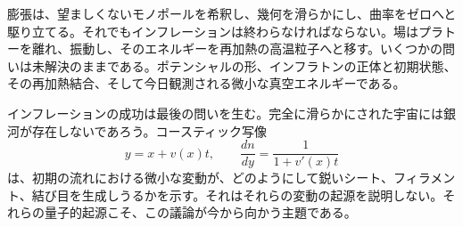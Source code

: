 膨張は、望ましくないモノポールを希釈し、幾何を滑らかにし、曲率をゼロへと駆り立てる。それでもインフレーションは終わらなければならない。場はプラトーを離れ、振動し、そのエネルギーを再加熱の高温粒子へと移す。いくつかの問いは未解決のままである。ポテンシャルの形、インフラトンの正体と初期状態、その再加熱結合、そして今日観測される微小な真空エネルギーである。

インフレーションの成功は最後の問いを生む。完全に滑らかにされた宇宙には銀河が存在しないであろう。コースティック写像
\[
y=x+v(x)t,
\qquad
\frac{dn}{dy}=\frac{1}{1+v'(x)t}
\]
は、初期の流れにおける微小な変動が、どのようにして鋭いシート、フィラメント、結び目を生成しうるかを示す。それはそれらの変動の起源を説明しない。それらの量子的起源こそ、この議論が今から向かう主題である。
